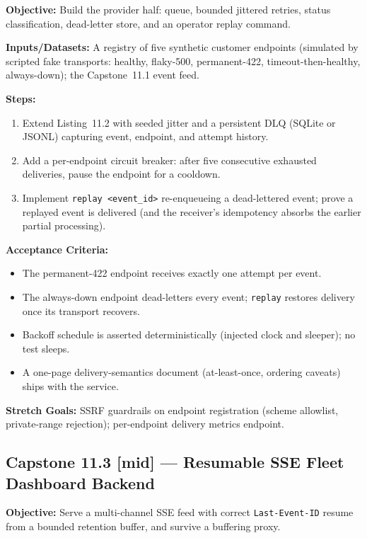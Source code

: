 \textbf{Objective:} Build the provider half: queue, bounded jittered retries,
status classification, dead-letter store, and an operator replay command.

\textbf{Inputs/Datasets:} A registry of five synthetic customer endpoints
(simulated by scripted fake transports: healthy, flaky-500, permanent-422,
timeout-then-healthy, always-down); the Capstone~11.1 event feed.

\textbf{Steps:}
\begin{enumerate}
  \item Extend Listing~11.2 with seeded jitter and a persistent DLQ
        (SQLite or JSONL) capturing event, endpoint, and attempt history.
  \item Add a per-endpoint circuit breaker: after five consecutive exhausted
        deliveries, pause the endpoint for a cooldown.
  \item Implement \texttt{replay <event\_id>} re-enqueueing a dead-lettered
        event; prove a replayed event is delivered (and the receiver's
        idempotency absorbs the earlier partial processing).
\end{enumerate}

\textbf{Acceptance Criteria:}
\begin{itemize}[label=$\square$]
  \item The permanent-422 endpoint receives exactly one attempt per event.
  \item The always-down endpoint dead-letters every event; \texttt{replay}
        restores delivery once its transport recovers.
  \item Backoff schedule is asserted deterministically (injected clock and
        sleeper); no test sleeps.
  \item A one-page delivery-semantics document (at-least-once, ordering
        caveats) ships with the service.
\end{itemize}

\textbf{Stretch Goals:} SSRF guardrails on endpoint registration (scheme
allowlist, private-range rejection); per-endpoint delivery metrics endpoint.

\subsection{Capstone 11.3 [mid] --- Resumable SSE Fleet Dashboard Backend}

\textbf{Objective:} Serve a multi-channel SSE feed with correct
\texttt{Last-Event-ID} resume from a bounded retention buffer, and survive a
buffering proxy.

